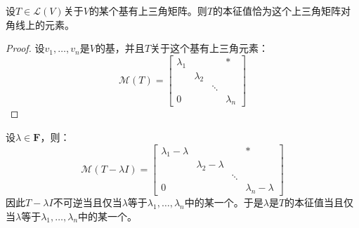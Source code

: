 \documentclass[10pt,a4paper,UTF8]{article}
\begin{document}
\begin{theorem}
设\(T\in \mathcal{L}(V)\)关于\(V\)的某个基有上三角矩阵。则\(T\)的本征值恰为这个上三角矩阵对角线上的元素。
\end{theorem}

\begin{proof}
设\(v_{1},\ldots ,v_{n}\)是\(V\)的基，并且\(T\)关于这个基有上三角元素：
\begin{equation}
\label{eq:22}
\mathcal{M}(T) =
\begin{bmatrix}
\lambda_{1} & & & * \\
            &\lambda_{2} & &  \\
& &\ddots & \\
0& &       & \lambda_{n}
\end{bmatrix}
\end{equation}
\end{proof}

设\(\lambda \in \mathbf{F}\)，则：
\begin{equation}
\label{eq:23}
\mathcal{M}(T - \lambda I) =
\begin{bmatrix}
\lambda_{1} - \lambda & & & * \\
            &\lambda_{2} - \lambda & &  \\
& &\ddots & \\
0& &       & \lambda_{n} - \lambda
\end{bmatrix}
\end{equation}
因此\(T-\lambda I\)不可逆当且仅当\(\lambda\)等于\(\lambda_{1},\ldots ,\lambda_{n}\)中的某一个。于是\(\lambda\)是\(T\)的本征值当且仅当\(\lambda\)等于\(\lambda_{1},\ldots ,\lambda_{n}\)中的某一个。
\end{document}
